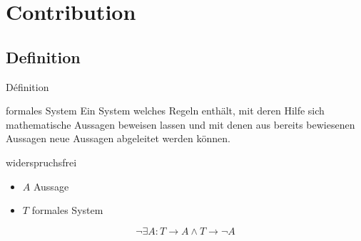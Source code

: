 \section{Contribution}
\subsection{Definition}
\begin{frame}{Définition}
    \begin{block}{formales System}
        Ein System welches Regeln enthält, mit deren Hilfe sich mathematische Aussagen beweisen lassen und mit denen aus bereits bewiesenen Aussagen neue Aussagen abgeleitet werden können.
    \end{block}
    \begin{block}{widerspruchsfrei}
        \begin{itemize}
            \item $A$ Aussage
            \item $T$ formales System
        \end{itemize}
        $$\neg\exists A: T\rightarrow{}A \wedge T\rightarrow{}\neg{}A $$
    \end{block}
\end{frame}